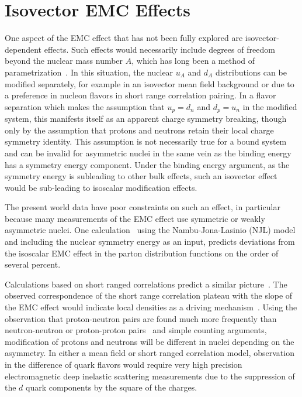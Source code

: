 \section{Isovector EMC Effects}

One aspect of the EMC effect that has not been fully explored are isovector-dependent effects.  Such effects would necessarily include degrees of freedom beyond the nuclear mass number $A$, which has long been a method of parametrization~\cite{Malace:2014uea}.  In this situation, the nuclear $u_A$ and $d_A$ distributions can be modified separately, for example in an isovector mean field background or due to a preference in nucleon flavors in short range correlation pairing.  In a flavor separation which makes the assumption that $u_p = d_n$ and $d_p = u_n$ in the modified system, this manifests itself as an apparent charge symmetry breaking, though only by the assumption that protons and neutrons retain their local charge symmetry identity. This assumption is not necessarily true for a bound system and can be invalid for asymmetric nuclei in the same vein as the binding energy has a symmetry energy component.  Under the binding energy argument, as the symmetry energy is subleading to other bulk effects, such an isovector effect would be sub-leading to isoscalar modification effects.

The present world data have poor constraints on such an effect, in particular because many measurements of the EMC effect use symmetric or weakly asymmetric nuclei.  One calculation~\cite{Cloet:2009qs} using the Nambu-Jona-Lasinio (NJL) model and including the nuclear symmetry energy as an input, predicts deviations from the isoscalar EMC effect in the parton distribution functions on the order of several percent.   

Calculations based on short ranged correlations predict a similar picture~\cite{Sargsian:2012sm}.  The observed correspondence of the short range correlation plateau with the slope of the EMC effect would indicate local densities as a driving mechanism~\cite{PhysRevLett.106.052301}.  Using the observation that proton-neutron pairs are found much more frequently than neutron-neutron or proton-proton pairs~\cite{Subedi:2008zz} and simple counting arguments, modification of protons and neutrons will be different in nuclei depending on the asymmetry.  In either a mean field or short ranged correlation model, observation in the difference of quark flavors would require very high precision electromagnetic deep inelastic scattering measurements due to the suppression of the $d$ quark components by the square of the charges. 

